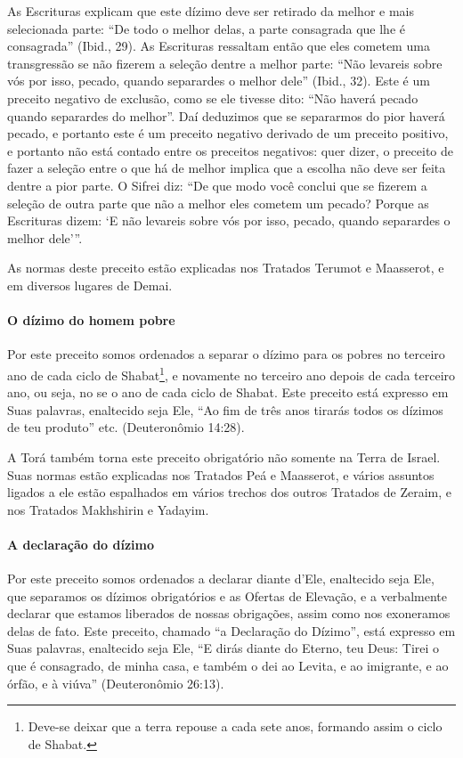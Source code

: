 As Escrituras explicam que este dízimo deve ser retirado da melhor e
mais selecionada parte: ``De todo o melhor delas, a parte consagrada que
lhe é consagrada'' (Ibid., 29). As Escrituras ressaltam então que eles
cometem uma transgressão se não fizerem a seleção dentre a melhor parte:
``Não levareis sobre vós por isso, pecado, quando separardes o melhor
dele'' (Ibid., 32). Este é um preceito negativo de exclusão, como se ele
tivesse dito: ``Não haverá pecado quando separardes do melhor''. Daí
deduzimos que se separarmos do pior haverá pecado, e portanto este é um
preceito negativo derivado de um preceito positivo, e portanto não está
contado entre os preceitos negativos: quer dizer, o preceito de fazer a
seleção entre o que há de melhor implica que a escolha não deve ser
feita dentre a pior parte. O Sifrei diz: ``De que modo você conclui que
se fizerem a seleção de outra parte que não a melhor eles cometem um
pecado? Porque as Escrituras dizem: `E não levareis sobre vós por isso,
pecado, quando separardes o melhor dele'''.

As normas deste preceito estão explicadas nos Tratados Terumot e
Maasserot, e em diversos lugares de Demai.

\paragraph{O dízimo do homem pobre}

Por este preceito somos ordenados a separar o dízimo para os pobres no
terceiro ano de cada ciclo de Shabat\footnote{Deve-se deixar que a terra repouse a cada sete anos, formando assim o
  ciclo de Shabat.}, e novamente
no terceiro ano depois de cada terceiro ano, ou seja, no se o ano de
cada ciclo de Shabat. Este preceito está expresso em Suas palavras,
enaltecido seja Ele, ``Ao fim de três anos tirarás todos os dízimos de
teu produto'' etc. (Deuteronômio 14:28).

A Torá também torna este preceito obrigatório não somente na Terra de
Israel. Suas normas estão explicadas nos Tratados Peá e Maasserot, e
vários assuntos ligados a ele estão espalhados em vários trechos dos
outros Tratados de Zeraim, e nos Tratados Makhshirin e Yadayim.

\paragraph{A declaração do dízimo}

Por este preceito somos ordenados a declarar diante d'Ele, enaltecido
seja Ele, que separamos os dízimos obrigatórios e as Ofertas de
Elevação, e a verbalmente declarar que estamos liberados de nossas
obrigações, assim como nos exoneramos delas de fato. Este preceito,
chamado ``a Declaração do Dízimo'', está expresso em Suas palavras,
enaltecido seja Ele, ``E dirás diante do Eterno, teu Deus: Tirei o que é
consagrado, de minha casa, e também o dei ao Levita, e ao imigrante, e
ao órfão, e à viúva'' (Deuteronômio 26:13).

